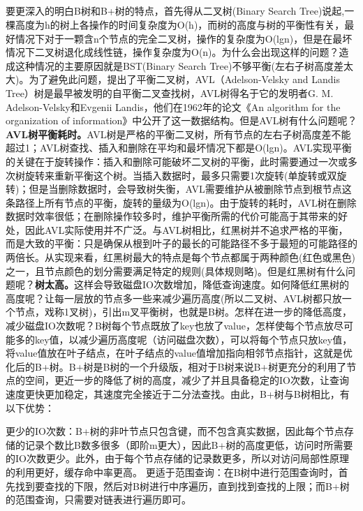 \documentclass[../../../interview-questions.tex]{subfiles}
\begin{document}
\subsection{\color{red}{B树和B+树是解决什么样的问题的，怎样演化过来，之间区别}}

要更深入的明白B树和B+树的特点，首先得从二叉树(Binary Search Tree)说起,一棵高度为h的树上各操作的时间复杂度为O(h)，而树的高度与树的平衡性有关，最好情况下对于一颗含n个节点的完全二叉树，操作的复杂度为O(lgn)，但是在最坏情况下二叉树退化成线性链，操作复杂度为O(n)。为什么会出现这样的问题？造成这种情况的主要原因就是BST(Binary Search Tree)不够平衡(左右子树高度差太大)。为了避免此问题，提出了平衡二叉树，AVL（Adelson-Velsky and Landis Tree）树是最早被发明的自平衡二叉查找树，AVL树得名于它的发明者G. M. Adelson-Velsky和Evgenii Landis，他们在1962年的论文《An algorithm for the organization of information》中公开了这一数据结构。但是AVL树有什么问题呢？\textbf{AVL树平衡耗时。}AVL树是严格的平衡二叉树，所有节点的左右子树高度差不能超过1；AVL树查找、插入和删除在平均和最坏情况下都是O(lgn)。AVL实现平衡的关键在于旋转操作：插入和删除可能破坏二叉树的平衡，此时需要通过一次或多次树旋转来重新平衡这个树。当插入数据时，最多只需要1次旋转(单旋转或双旋转)；但是当删除数据时，会导致树失衡，AVL需要维护从被删除节点到根节点这条路径上所有节点的平衡，旋转的量级为O(lgn)。由于旋转的耗时，AVL树在删除数据时效率很低；在删除操作较多时，维护平衡所需的代价可能高于其带来的好处，因此AVL实际使用并不广泛。与AVL树相比，红黑树并不追求严格的平衡，而是大致的平衡：只是确保从根到叶子的最长的可能路径不多于最短的可能路径的两倍长。从实现来看，红黑树最大的特点是每个节点都属于两种颜色(红色或黑色)之一，且节点颜色的划分需要满足特定的规则(具体规则略)。但是红黑树有什么问题呢？\textbf{树太高。}这样会导致磁盘IO次数增加，降低查询速度。如何降低红黑树的高度呢？让每一层放的节点多一些来减少遍历高度(所以二叉树、AVL树都只放一个节点，戏称1叉树)，引出m叉平衡树，也就是B树。怎样在进一步的降低高度，减少磁盘IO次数呢？B树每个节点既放了key也放了value，怎样使每个节点放尽可能多的key值，以减少遍历高度呢（访问磁盘次数），可以将每个节点只放key值，将value值放在叶子结点，在叶子结点的value值增加指向相邻节点指针，这就是优化后的B+树。B+树是B树的一个升级版，相对于B树来说B+树更充分的利用了节点的空间，更近一步的降低了树的高度，减少了并且具备稳定的IO次数，让查询速度更快更加稳定，其速度完全接近于二分法查找。由此，B+树与B树相比，有以下优势：

更少的IO次数：B+树的非叶节点只包含键，而不包含真实数据，因此每个节点存储的记录个数比B数多很多（即阶m更大），因此B+树的高度更低，访问时所需要的IO次数更少。此外，由于每个节点存储的记录数更多，所以对访问局部性原理的利用更好，缓存命中率更高。
更适于范围查询：在B树中进行范围查询时，首先找到要查找的下限，然后对B树进行中序遍历，直到找到查找的上限；而B+树的范围查询，只需要对链表进行遍历即可。
\end{document}
